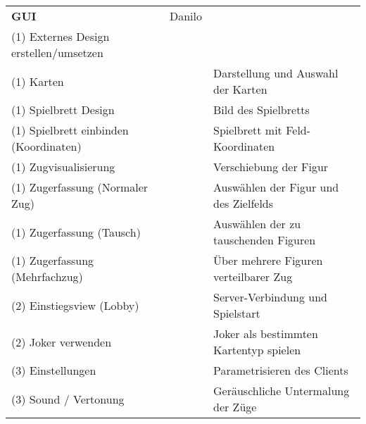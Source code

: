 \documentclass[a4paper,12pt,halfparskip,DIV14]{scrartcl}
\begin{document}
\begin{tabular}{@{} l l l @{}}
\midrule
\textbf{GUI} & Danilo & \\
(1) Externes Design erstellen/umsetzen &  & \\
(1) Karten &  & Darstellung und Auswahl der Karten \\
(1) Spielbrett Design &  & Bild des Spielbretts \\
(1) Spielbrett einbinden (Koordinaten) &  & Spielbrett mit Feld-Koordinaten \\
(1) Zugvisualisierung &  & Verschiebung der Figur \\
(1) Zugerfassung (Normaler Zug) &  & Auswählen der Figur und des Zielfelds \\
(1) Zugerfassung (Tausch) &  & Auswählen der zu tauschenden Figuren \\
(1) Zugerfassung (Mehrfachzug) &  & Über mehrere Figuren verteilbarer Zug \\
(2) Einstiegsview (Lobby) &  & Server-Verbindung und Spielstart \\
(2) Joker verwenden &  & Joker als bestimmten Kartentyp spielen \\
(3) Einstellungen &  & Parametrisieren des Clients \\
(3) Sound / Vertonung &  & Geräuschliche Untermalung der Züge \\
\bottomrule
\end{tabular}
\end{document}
